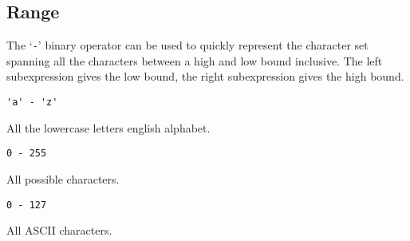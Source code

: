 
\subsection{Range}
{
	The `\texttt{-}' binary operator can be used to quickly represent the
	character set
	spanning all the characters between a high and low bound inclusive.
	The left subexpression gives the low bound, the right subexpression gives
	the high bound.
	
	\begin{itemize}
	{
		\item[] \lstinline[language=MAIA, columns=fixed]@'a' - 'z'@
		
			All the lowercase letters english alphabet.
		
		\item[] \lstinline[language=MAIA, columns=fixed]@0 - 255@
		
			All possible characters.
		
		\item[] \lstinline[language=MAIA, columns=fixed]@0 - 127@
		
			All ASCII characters.
	}
	\end{itemize}
}
